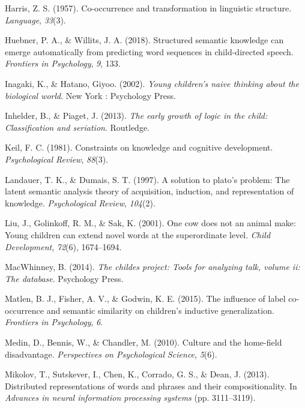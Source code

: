 \documentclass[10pt, letterpaper]{article}
\begin{document}
\leavevmode\hypertarget{ref-harris1957}{}%
Harris, Z. S. (1957). Co-occurrence and transformation in linguistic
structure. \emph{Language}, \emph{33}(3).

\leavevmode\hypertarget{ref-huebner2018}{}%
Huebner, P. A., \& Willits, J. A. (2018). Structured semantic knowledge
can emerge automatically from predicting word sequences in
child-directed speech. \emph{Frontiers in Psychology}, \emph{9}, 133.

\leavevmode\hypertarget{ref-inagaki2002}{}%
Inagaki, K., \& Hatano, Giyoo. (2002). \emph{Young children's naive
thinking about the biological world}. New York : Psychology Press.

\leavevmode\hypertarget{ref-inhelder2013}{}%
Inhelder, B., \& Piaget, J. (2013). \emph{The early growth of logic in
the child: Classification and seriation}. Routledge.

\leavevmode\hypertarget{ref-keil1981}{}%
Keil, F. C. (1981). Constraints on knowledge and cognitive development.
\emph{Psychological Review}, \emph{88}(3).

\leavevmode\hypertarget{ref-landauer1997}{}%
Landauer, T. K., \& Dumais, S. T. (1997). A solution to plato's problem:
The latent semantic analysis theory of acquisition, induction, and
representation of knowledge. \emph{Psychological Review}, \emph{104}(2).

\leavevmode\hypertarget{ref-liu2001}{}%
Liu, J., Golinkoff, R. M., \& Sak, K. (2001). One cow does not an animal
make: Young children can extend novel words at the superordinate level.
\emph{Child Development}, \emph{72}(6), 1674--1694.

\leavevmode\hypertarget{ref-macwhinney2014}{}%
MacWhinney, B. (2014). \emph{The childes project: Tools for analyzing
talk, volume ii: The database}. Psychology Press.

\leavevmode\hypertarget{ref-matlen2015}{}%
Matlen, B. J., Fisher, A. V., \& Godwin, K. E. (2015). The influence of
label co-occurrence and semantic similarity on children's inductive
generalization. \emph{Frontiers in Psychology}, \emph{6}.

\leavevmode\hypertarget{ref-medin2010}{}%
Medin, D., Bennis, W., \& Chandler, M. (2010). Culture and the
home-field disadvantage. \emph{Perspectives on Psychological Science},
\emph{5}(6).

\leavevmode\hypertarget{ref-mikolov2013}{}%
Mikolov, T., Sutskever, I., Chen, K., Corrado, G. S., \& Dean, J.
(2013). Distributed representations of words and phrases and their
compositionality. In \emph{Advances in neural information processing
systems} (pp. 3111--3119).
\end{document}
